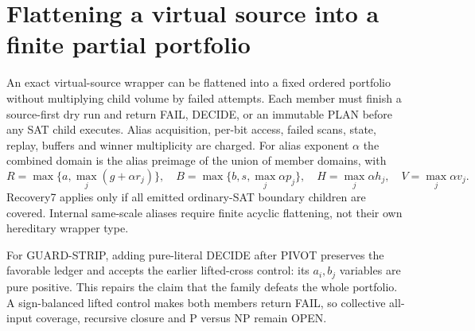 \section{Flattening a virtual source into a finite partial portfolio}
An exact virtual-source wrapper can be flattened into a fixed ordered
portfolio without multiplying child volume by failed attempts.  Each member
must finish a source-first dry run and return FAIL, DECIDE, or an immutable
PLAN before any SAT child executes.  Alias acquisition, per-bit access,
failed scans, state, replay, buffers and winner multiplicity are charged.
For alias exponent $\alpha$ the combined domain is the alias preimage of the
union of member domains, with
\[
 R=\max\{a,\max_j(g+\alpha r_j)\},\quad
 B=\max\{b,s,\max_j\alpha p_j\},\quad
 H=\max_j\alpha h_j,\quad V=\max_j\alpha v_j.
\]
Recovery7 applies only if all emitted ordinary-SAT boundary children are
covered.  Internal same-scale aliases require finite acyclic flattening, not
their own hereditary wrapper type.

For GUARD-STRIP, adding pure-literal DECIDE after PIVOT preserves the favorable
ledger and accepts the earlier lifted-cross control: its $a_i,b_j$ variables
are pure positive.  This repairs the claim that the family defeats the whole
portfolio.  A sign-balanced lifted control makes both members return FAIL,
so collective all-input coverage, recursive closure and P versus NP remain
OPEN.
